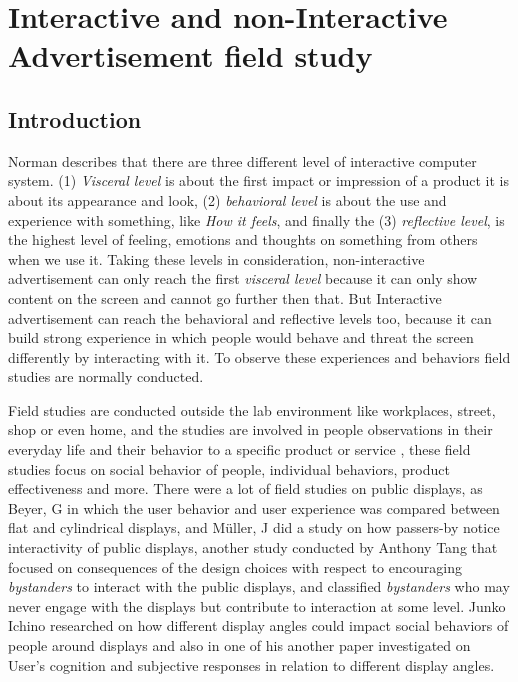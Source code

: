 \chapter{Interactive and non-Interactive Advertisement field study} %

\label{Chapter8} %
\newpage

\section{Introduction}
Norman \cite{norman} describes that there are three different level of interactive computer system. (1) \emph{Visceral level} is about the first impact or impression of a product it is about its appearance and look, (2) \emph{behavioral level} is about the use and experience with something, like \emph{How it feels}, and finally the (3) \emph{reflective level}, is the highest level of feeling, emotions and thoughts on something from others when we use it. Taking these levels in consideration, non-interactive advertisement can only reach the first \emph{visceral level} because it can only show content on the screen and cannot go further then that. But Interactive advertisement can reach the behavioral and reflective levels too, because it can build strong experience in which people would behave and threat the screen differently by interacting with it. To observe these experiences and behaviors field studies are normally conducted.

Field studies are conducted outside the lab environment like workplaces, street, shop or even home, and the studies are involved in people observations in their everyday life and their behavior to a specific product or service \cite{field_study}, these field studies focus on social behavior of people, individual behaviors, product effectiveness and more. There were a lot of field studies on public displays, as Beyer, G \cite{CylindricalScreen} in which the user behavior and user experience was compared between flat and cylindrical displays, and Müller, J \cite{LookingGlass} did a study on how passers-by notice interactivity of public displays, another study conducted by Anthony Tang \cite{Bystanders} that focused on consequences of the design choices with respect to encouraging \emph{bystanders} to interact with the public displays, and classified \emph{bystanders} who may never engage with the displays but contribute to interaction at some level. Junko Ichino \cite{DisplayAngleEffect} researched on how different display angles could impact social behaviors of people around displays and also in one of his another paper \cite{DisplayAngleEffect2} investigated on User's cognition and subjective responses in relation to different display angles.

